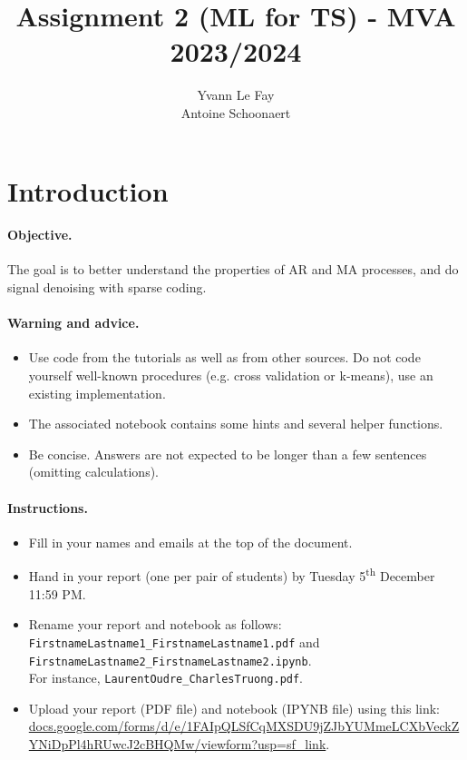 \documentclass[11pt]{article}
\title{Assignment 2 (ML for TS) - MVA 2023/2024}
\author{
Yvann Le Fay \email{yvann.lefay@ensae.fr} \\ %
Antoine Schoonaert \email{antoine.schoonaert@etu.emse.fr} %
}
\begin{document}
\maketitle

\section{Introduction}

\paragraph{Objective.} The goal is to better understand the properties of AR and MA processes, and do signal denoising with sparse coding.

\paragraph{Warning and advice.}
\begin{itemize}
    \item Use code from the tutorials as well as from other sources. Do not code yourself well-known procedures (e.g. cross validation or k-means), use an existing implementation.
    \item The associated notebook contains some hints and several helper functions.
    \item Be concise. Answers are not expected to be longer than a few sentences (omitting calculations).
\end{itemize}



\paragraph{Instructions.}
\begin{itemize}
    \item Fill in your names and emails at the top of the document.
    \item Hand in your report (one per pair of students) by Tuesday 5\textsuperscript{th} December 11:59 PM.
    \item Rename your report and notebook as follows:\\ \texttt{FirstnameLastname1\_FirstnameLastname1.pdf} and\\ \texttt{FirstnameLastname2\_FirstnameLastname2.ipynb}.\\
    For instance, \texttt{LaurentOudre\_CharlesTruong.pdf}.
    \item Upload your report (PDF file) and notebook (IPYNB file) using this link: \href{https://docs.google.com/forms/d/e/1FAIpQLSfCqMXSDU9jZJbYUMmeLCXbVeckZYNiDpPl4hRUwcJ2cBHQMw/viewform?usp=sf_link}{docs.google.com/forms/d/e/1FAIpQLSfCqMXSDU9jZJbYUMmeLCXbVeckZYNiDpPl4hRUwcJ2cBHQMw/viewform?usp=sf\_link}.
\end{itemize}
\end{document}
